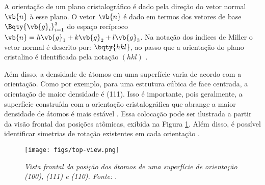 A orientação de um plano cristalográfico é dado pela direção do vetor normal $ \vb{n} $ à esse plano. O vetor $ \vb{n} $ é dado em termos dos vetores de base $ \Bqty{\vb{g}_i}_{i=1}^{3} $ do espaço recíproco $ \vb{n}=h\vb{g}_1+k\vb{g}_2+l\vb{g}_3 $. Na notação dos índices de Miller o vetor normal é descrito por: $ \bqty{hkl} $, ao passo que a orientação do plano cristalino é identificada pela notação $ (hkl) $ \cite{surface-book}.




Aém disso, a densidade de átomos em uma superfície varia de acordo com a orientação. Como por exemplo, para uma estrutura cúbica de face centrada, a orientação de maior densidade é (111). Isso é importante, pois geralmente, a superfície construída com a orientação cristalográfica que abrange a maior densidade de átomos é mais estável \cite{density-book}. Essa colocação pode ser ilustrada a partir da visão frontal das posições atômicas, exibida na Figura \ref{fig:top}. Além disso, é possível identificar simetrias de rotação existentes em cada orientação \cite{density-book}.  
\begin{figure}[H]
	\centering
	\texttt{[image: figs/top-view.png]}
	\caption{\textit{Vista frontal da posição dos átomos de uma superfície de orientação (100), (111) e (110). Fonte: \citeauthor{density-book}}.}
	\label{fig:top}
\end{figure}

